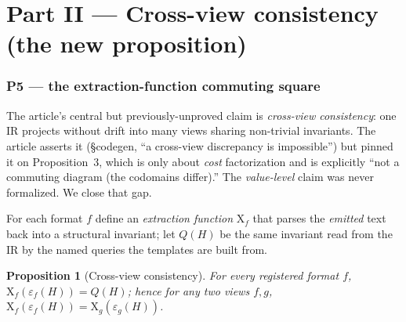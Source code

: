 \documentclass[11pt]{article}
\newtheorem{proposition}{Proposition}
\theoremstyle{definition}
\newcommand{\X}{\mathrm{X}}
\begin{document}
\part*{Part II --- Cross-view consistency (the new proposition)}

\section{P5 --- the extraction-function commuting square}
\label{sec:p5}

The article's central but previously-unproved claim is \emph{cross-view consistency}: one IR projects without
drift into many views sharing non-trivial invariants. The article asserts it (\S codegen, ``a cross-view
discrepancy is impossible'') but pinned it on Proposition~3, which is only about \emph{cost} factorization and is
explicitly ``not a commuting diagram (the codomains differ).'' The \emph{value-level} claim was never formalized.
We close that gap.

For each format $f$ define an \emph{extraction function} $\X_f$ that parses the \emph{emitted} text back into a
structural invariant; let $Q(H)$ be the same invariant read from the IR by the named queries the templates are
built from.

\begin{proposition}[Cross-view consistency]
For every registered format $f$, $\X_f(\varepsilon_f(H)) = Q(H)$; hence for any two views $f,g$,
$\X_f(\varepsilon_f(H)) = \X_g(\varepsilon_g(H))$.
\end{proposition}

\begin{center}
\end{center}
\end{document}
